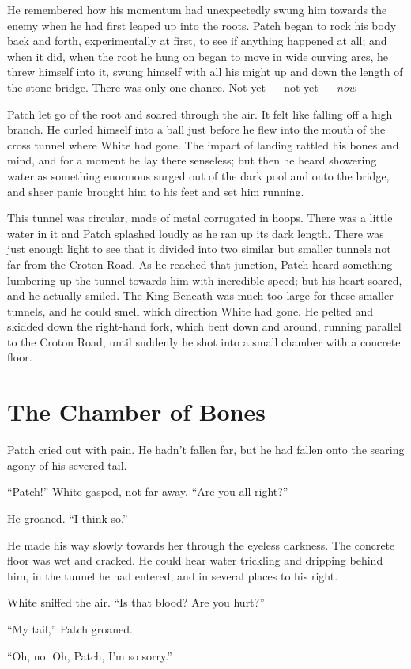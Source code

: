 \documentclass[ebook,oneside,openany,17pt]{memoir}
\renewcommand{\thechapter}{\Roman{chapter}}
\newcounter{sections}
\newcommand{\sections}[1]{%
  \section*{#1}
  \addtocounter{sections}{1}%
  \pdfbookmark[1]{#1}{section.\thechapter.\thesections}}
\begin{document}
He remembered how his momentum had unexpectedly swung him towards the
enemy when he had first leaped up into the roots. Patch began to rock
his body back and forth, experimentally at first, to see if anything
happened at all; and when it did, when the root he hung on began to
move in wide curving arcs, he threw himself into it, swung himself
with all his might up and down the length of the stone bridge. There
was only one chance. Not yet — not yet — \emph{now} —

Patch let go of the root and soared through the air. It felt like
falling off a high branch. He curled himself into a ball just before
he flew into the mouth of the cross tunnel where White had gone. The
impact of landing rattled his bones and mind, and for a moment he lay
there senseless; but then he heard showering water as something
enormous surged out of the dark pool and onto the bridge, and sheer
panic brought him to his feet and set him running.

This tunnel was circular, made of metal corrugated in hoops. There was
a little water in it and Patch splashed loudly as he ran up its dark
length. There was just enough light to see that it divided into two
similar but smaller tunnels not far from the Croton Road. As he
reached that junction, Patch heard something lumbering up the tunnel
towards him with incredible speed; but his heart soared, and he
actually smiled. The King Beneath was much too large for these smaller
tunnels, and he could smell which direction White had gone. He pelted
and skidded down the right-hand fork, which bent down and around,
running parallel to the Croton Road, until suddenly he shot into a
small chamber with a concrete floor.


\sections{The Chamber of Bones}

Patch cried out with pain. He hadn’t fallen far, but he had fallen
onto the searing agony of his severed tail.

“Patch!” White gasped, not far away. “Are you all right?”

He groaned. “I think so.”

He made his way slowly towards her through the eyeless darkness. The
concrete floor was wet and cracked. He could hear water trickling and
dripping behind him, in the tunnel he had entered, and in several
places to his right.

White sniffed the air. “Is that blood? Are you hurt?”

“My tail,” Patch groaned.

“Oh, no. Oh, Patch, I’m so sorry.”
\end{document}
